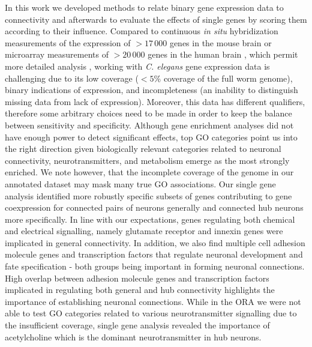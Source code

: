\documentclass[10pt,letterpaper]{article}
\begin{document}
{%
In this work we developed methods to relate binary gene expression data to connectivity and afterwards to evaluate the effects of single genes by scoring them according to their influence.
Compared to continuous \emph{in situ} hybridization measurements of the expression of $>17\,000$ genes in the mouse brain \cite{Lein:2007jn} or microarray measurements of $>20\,000$ genes in the human brain \cite{Hawrylycz:2012ky, Shen:2012ua}, which permit more detailed analysis \cite{Fulcher:2016ck, Ji:2014jw, Fakhry:2015kl, French2011, Vertes2016a, Parkes:2017dn}, working with \emph{C. elegans} gene expression data is challenging due to its low coverage ($<5$\% coverage of the full worm genome), binary indications of expression, and incompleteness (an inability to distinguish missing data from lack of expression).
Moreover, this data has different qualifiers, therefore some arbitrary choices need to be made in order to keep the balance between sensitivity and specificity. 
Although gene enrichment analyses did not have enough power to detect significant effects, top GO categories point us into the right direction given biologically relevant categories related to neuronal connectivity, neurotransmitters, and metabolism emerge as the most strongly enriched. 
We note however, that the incomplete coverage of the genome in our annotated dataset may mask many true GO associations. 
Our single gene analysis identified more robustly specific subsets of genes contributing to gene coexpression for connected pairs of neurons generally and connected hub neurons more specifically.
In line with our expectations, genes regulating both chemical and electrical signalling, namely glutamate receptor and innexin genes were implicated in general connectivity. 
In addition, we also find multiple cell adhesion molecule genes and transcription factors that regulate neuronal development and fate specification - both groups being important in forming neuronal connections. 
High overlap between adhesion molecule genes and transcription factors implicated in regulating both general and hub connectivity highlights the importance of establishing neuronal connections. 
While in the ORA we were not able to test GO categories related to various neurotransmitter signalling due to the insufficient coverage, single gene analysis revealed the importance of acetylcholine which is the dominant neurotransmitter in hub neurons. 
}
\end{document}

